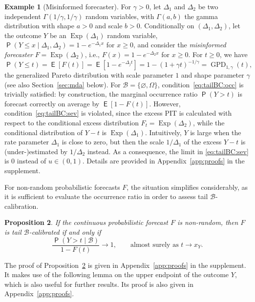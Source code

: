 \documentclass[12pt]{article}
\newcommand{\E}{\operatorname{\mathsf{E}}}
\newcommand{\Q}{\operatorname{\mathsf{P}}}
\newcommand{\Bb}{\mathcal{B}}
\newcommand{\GPD}{\operatorname{GPD}} %
\newcommand{\Exp}{\operatorname{Exp}} %
\newcommand{\1}{\mathbf{1}} %
\newtheorem{propo}{Proposition}
\theoremstyle{definition}
\newtheorem{example}[propo]{Example}
\begin{document}
\begin{example}[Misinformed forecaster]
\label{ex:mis}
For $\gamma > 0$, let $\Delta_1$ and $\Delta_2$ be two independent $\Gamma(1/\gamma,1/\gamma)$ random variables, with $\Gamma(a, b)$ the gamma distribution with shape $a > 0$ and scale $b > 0$. Conditionally on $(\Delta_1,\Delta_2)$, let the outcome $Y$ be an $\Exp(\Delta_1)$ random variable, $\Q(Y \le x \mid \Delta_1, \Delta_2) = 1-e^{-\Delta_1 x}$ for $x \ge 0$, and consider the \emph{misinformed forecaster} $F = \Exp(\Delta_2)$, i.e., $F(x) = 1 - e^{-\Delta_2 x}$ for $x \ge 0$. For $t \ge 0$, we have
\[
	\Q(Y \le t) = \E[F(t)] = \E[1 - e^{-\Delta_j t}]
	= 1 - (1+\gamma t)^{-1/\gamma} = \GPD_{1,\gamma}(t),
\]
the generalized Pareto distribution with scale parameter $1$ and shape parameter $\gamma$ (see also Section~\ref{sec:mda} below). For $\Bb = \{\varnothing, \Omega\}$, condition~\eqref{eq:tailBC:occ} is trivially satisfied: by construction, the marginal occurrence ratio $\Q(Y > t)$ is forecast correctly on average by $\E[1-F(t)]$. However, condition~\eqref{eq:tailBC:sev} is violated, since the excess PIT is calculated with respect to the conditional excess distribution $F_t = \Exp(\Delta_2)$, while the conditional distribution of $Y-t$ is $\Exp(\Delta_1)$. Intuitively, $Y$ is large when the rate parameter $\Delta_1$ is close to zero, but then the scale $1/\Delta_1$ of the excess $Y-t$ is (under-)estimated by $1/\Delta_2$ instead. As a consequence, the limit in \eqref{eq:tailBC:sev} is $0$ instead of $u \in (0, 1)$. Details are provided in Appendix~\ref{app:proofs} in the supplement.
\end{example}

For non-random probabilistic forecasts $F$, the situation simplifies considerably, as it is sufficient to evaluate the occurrence ratio in order to assess tail $\Bb$-calibration.

\begin{propo}
\label{propo:tailequiv}
If the continuous probabilistic forecast $F$ is non-random, then $F$ is tail $\Bb$-calibrated if and only if 
\begin{equation}
    \label{eq:tailBC3}
    \frac{\Q(Y > t \mid \Bb)}{1-F(t)} \to 1, \qquad \text{almost surely as $t \to x_Y$.}
\end{equation}
\end{propo}

The proof of Proposition~\ref{propo:tailequiv} is given in Appendix~\ref{app:proofs} in the supplement. It makes use of the following lemma on the upper endpoint of the outcome $Y$, which is also useful for further results. Its proof is also given in Appendix~\ref{app:proofs}.
\end{document}
